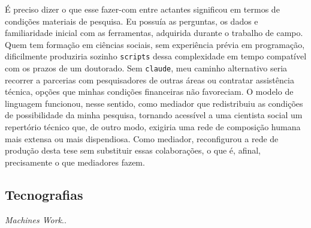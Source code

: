 É preciso dizer o que esse fazer-com entre actantes significou em termos de condições materiais de pesquisa. Eu possuía as perguntas, os dados e familiaridade inicial com as ferramentas, adquirida durante o trabalho de campo. Quem tem formação em ciências sociais, sem experiência prévia em programação, dificilmente produziria sozinho \texttt{scripts} dessa complexidade em tempo compatível com os prazos de um doutorado. Sem \texttt{claude}, meu caminho alternativo seria recorrer a parcerias com pesquisadores de outras áreas ou contratar assistência técnica, opções que minhas condições financeiras não favoreciam. O modelo de linguagem funcionou, nesse sentido, como mediador que redistribuiu as condições de possibilidade da minha pesquisa, tornando acessível a uma cientista social um repertório técnico que, de outro modo, exigiria uma rede de composição humana mais extensa ou mais dispendiosa. Como mediador, reconfigurou a rede de produção desta tese sem substituir essas colaborações, o que é, afinal, precisamente o que mediadores fazem.

\subsection{Tecnografias}
\label{subsec:tecnoetnografia}

{\textit{Machines Work}.\textcite{biftek2000machines}.}


